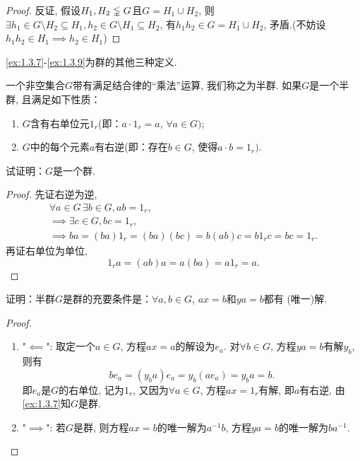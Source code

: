 \begin{proof}
    反证, 假设$H_1, H_2 \lvertneqq G$且$G = H_1 \cup H_2$,
则$\exists h_1 \in G \setminus H_2 \subseteq H_1, h_2 \in G \setminus H_1 \subseteq H_2$,
有$h_1h_2 \in G = H_1 \cup H_2$, 矛盾.(不妨设$h_1h_2 \in H_1 \implies h_2 \in H_1$)
\end{proof}

\ref{ex:1.3.7}-\ref{ex:1.3.9}为群的其他三种定义.

\begin{problem}\label{ex:1.3.7}
    一个非空集合$G$带有满足结合律的“乘法”运算, 我们称之为半群.
如果$G$是一个半群, 且满足如下性质：
\begin{enumerate}[(1)]
    \item $G$含有右单位元$1_r$(即：$a \cdot 1_r = a$, $\forall a \in G)$;
    \item $G$中的每个元素$a$有右逆(即：存在$b \in G$, 使得$a \cdot b = 1_r)$.
\end{enumerate}
试证明：$G$是一个群.
\end{problem}

\begin{proof}
    先证右逆为逆, 
\[
\begin{gathered}
    \forall a \in G \, \exists b \in G, ab = 1_r,\\
    \implies \exists c \in G, bc = 1_r,\\
    \implies ba = (ba)1_r = (ba)(bc) = b(ab)c = b1_rc = bc = 1_r.
\end{gathered}
\]
    再证右单位为单位, 
\[
    1_ra = (ab)a = a(ba) = a1_r = a.
\]
\end{proof}

\begin{problem}\label{ex:1.3.8}
    证明：半群$G$是群的充要条件是：$\forall a, b \in G$, $ax = b$和$ya = b$都有
(唯一)解.
\end{problem}

\begin{proof}
\begin{enumerate}[(1)]
    \item "$\impliedby$": 取定一个$a \in G$, 方程$ax = a$的解设为$e_a$.
对$\forall b \in G$, 方程$ya = b$有解$y_b$, 则有
\[
    be_a = (y_ba)e_a = y_b(ae_a) = y_ba = b.
\]
即$e_a$是$G$的右单位, 记为$1_r$, 又因为$\forall a \in G$,
方程$ax = 1_r$有解, 即$a$有右逆, 由\ref{ex:1.3.7}知$G$是群.
    \item "$\implies$": 若$G$是群, 则方程$ax = b$的唯一解为$a^{-1}b$,
方程$ya = b$的唯一解为$ba^{-1}$.
\end{enumerate}
    
\end{proof}

